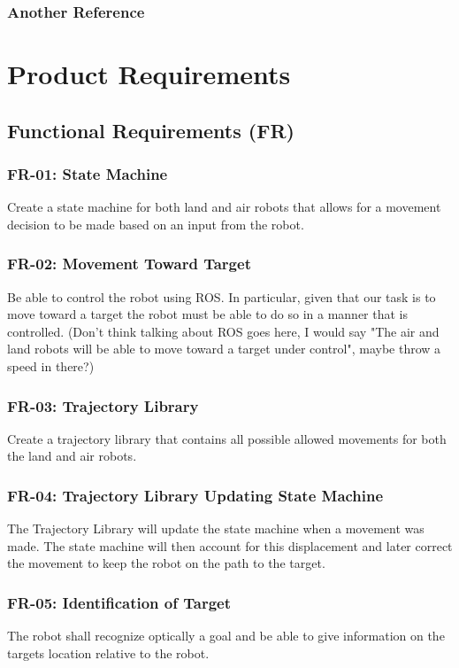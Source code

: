 \documentclass[]{report}
\begin{document}
\subsection{Another Reference}



\chapter{Product Requirements}

\section{Functional Requirements (FR)}

\subsection{FR-01: State Machine}
Create a state machine for both land and air robots that allows for a movement decision to be made based on an input from the robot. 

\subsection{FR-02: Movement Toward Target}
Be able to control the robot using ROS. In particular, given that our task is to move toward a target the robot must be able to do so in a manner that is controlled. (Don't think talking about ROS goes here, I would say "The air and land robots will be able to move toward a target under control", maybe throw a speed in there?)

\subsection{FR-03: Trajectory Library}
Create a trajectory library that contains all possible allowed movements for both the land and air robots.

\subsection{FR-04: Trajectory Library Updating State Machine}
The Trajectory Library will update the state machine when a movement was made. The state machine will then account for this displacement and later correct the movement to keep the robot on the path to the target. 

\subsection{FR-05: Identification of Target}
The robot shall recognize optically a goal and be able to give information on the targets location relative to the robot. 
\end{document}
